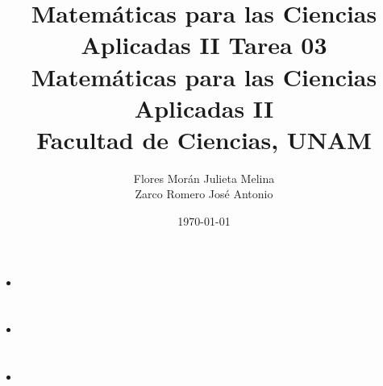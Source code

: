 \documentclass[12pt]{article}
\title{Matemáticas para las Ciencias Aplicadas II}
\title{
        \textbf{Tarea 03} \\
        \vspace{1ex}
        \large Matemáticas para las Ciencias Aplicadas II \\
        Facultad de Ciencias, UNAM}
\date{\today}
\author{Flores Morán Julieta Melina \\ Zarco Romero José Antonio}
\begin{document}
\maketitle

\section{}

\begin{itemize}[format=\textbf]

\item

\end{itemize}

\section{}

\section{}

\begin{itemize}[format=\textbf]

\item

\end{itemize}

\section{}

\begin{itemize}[format=\textbf]

\item

\end{itemize}

\section{}
\end{document}
